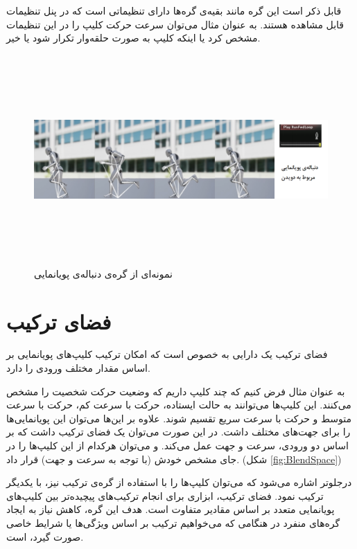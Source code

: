 قابل ذکر است این گره‌ مانند بقیه‌ی گره‌ها دارای تنظیماتی است که در پنل تنظیمات قابل مشاهده‌ هستند. به عنوان مثال 
می‌توان سرعت حرکت کلیپ را در این تنظیمات مشخص کرد یا اینکه کلیپ به صورت حلقه‌وار تکرار شود یا خیر.

\begin{figure}[ht]
	\centerline{\includegraphics[width=\textwidth,height=8cm,keepaspectratio]{Figures/Ch3/AnimationSequence.png}}

	\caption{نمونه‌ای از گره‌ی دنباله‌ی پویانمایی}
	\label{fig:AnimationSequence}
\end{figure}



\section {فضای ترکیب}

فضای ترکیب یک دارایی به خصوص است که 
امکان ترکیب کلیپ‌های پویانمایی بر اساس مقدار مختلف ورودی را دارد.

به عنوان مثال فرض کنیم که چند کلیپ داریم که 
وضعیت حرکت شخصیت را مشخص می‌کنند.
این کلیپ‌ها می‌توانند به 
حالت ایستاده، حرکت با سرعت کم، حرکت با سرعت متوسط 
و حرکت با سرعت سریع تقسیم شوند.
علاوه‌ بر این‌ها می‌توان این پویانمایی‌ها را برای جهت‌های مختلف داشت.
در این صورت می‌توان یک فضای ترکیب داشت که بر اساس 
دو ورودی، سرعت و جهت عمل می‌کند.
و می‌توان هرکدام از این کلیپ‌ها را در جای مشخص خودش 
(با توجه به سرعت و جهت)
قرار داد.
(شکل \ref{fig:BlendSpace})

درجلوتر اشاره می‌شود که می‌توان کلیپ‌ها را با استفاده از 
گره‌ی ترکیب نیز، با یکدیگر ترکیب نمود. 
فضای ترکیب، ابزاری برای انجام ترکیب‌های پیچیده‌تر 
بین کلیپ‌های پویانمایی متعدد بر اساس 
مقادیر متفاوت است.
هدف این گره، کاهش نیاز به ایجاد گره‌های منفرد
در هنگامی که می‌خواهیم ترکیب بر اساس ویژگی‌ها یا شرایط خاصی 
صورت گیرد، است.


